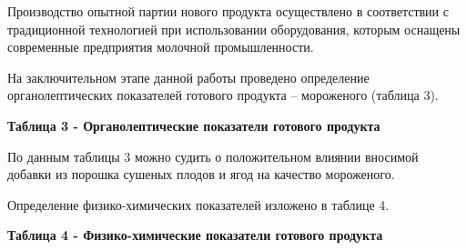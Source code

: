 {{Производство опытной партии нового продукта осуществлено в соответствии
с традиционной технологией при использовании оборудования, которым
оснащены современные предприятия молочной промышленности.

На заключительном этапе данной работы проведено определение
органолептических показателей готового продукта -- мороженого (таблица
3).

{\bfseries Таблица 3 - Органолептические показатели готового продукта}


По данным таблицы 3 можно судить о положительном влиянии вносимой
добавки из порошка сушеных плодов и ягод на качество мороженого.

Определение физико-химических показателей изложено в таблице 4.

{\bfseries Таблица 4 - Физико-химические показатели готового продукта}


}}
